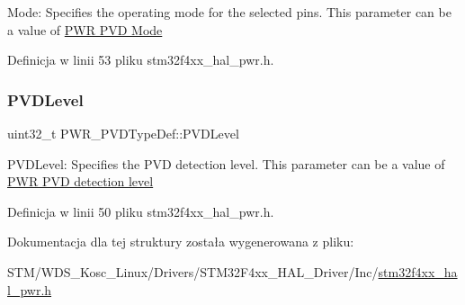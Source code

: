 Mode\+: Specifies the operating mode for the selected pins. This parameter can be a value of \hyperlink{group___p_w_r___p_v_d___mode}{P\+WR P\+VD Mode} 

Definicja w linii 53 pliku stm32f4xx\+\_\+hal\+\_\+pwr.\+h.

\mbox{\label{struct_p_w_r___p_v_d_type_def_a540471bc6ac947fd8bc2c87f61d9faab}} 
\subsubsection{\texorpdfstring{P\+V\+D\+Level}{PVDLevel}}
{\footnotesize\ttfamily uint32\+\_\+t P\+W\+R\+\_\+\+P\+V\+D\+Type\+Def\+::\+P\+V\+D\+Level}

P\+V\+D\+Level\+: Specifies the P\+VD detection level. This parameter can be a value of \hyperlink{group___p_w_r___p_v_d__detection__level}{P\+WR P\+VD detection level} 

Definicja w linii 50 pliku stm32f4xx\+\_\+hal\+\_\+pwr.\+h.



Dokumentacja dla tej struktury została wygenerowana z pliku\+:\begin{DoxyCompactItemize}
\item 
S\+T\+M/\+W\+D\+S\+\_\+\+Kosc\+\_\+\+Linux/\+Drivers/\+S\+T\+M32\+F4xx\+\_\+\+H\+A\+L\+\_\+\+Driver/\+Inc/\hyperlink{stm32f4xx__hal__pwr_8h}{stm32f4xx\+\_\+hal\+\_\+pwr.\+h}\end{DoxyCompactItemize}
